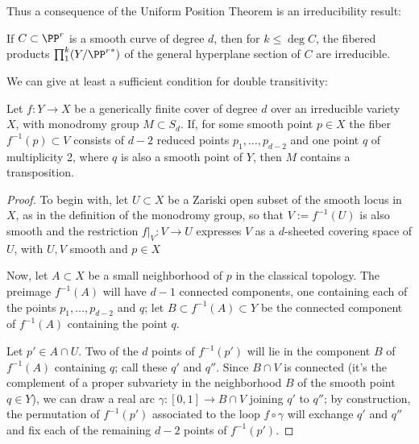 Thus a consequence of the Uniform Position Theorem is an irreducibility result:

\begin{corollary} If $C\subset \PP^r$ is a smooth curve of degree $d$, then 
for $k\leq \deg C$, the fibered products $\prod_1^k(Y/{\PP^r}^*)$  of the general hyperplane section 
of $C$ are irreducible.
\end{corollary}

We can give at least a sufficient condition for double transitivity:
\begin{lemma}\label{transposition lemma}
Let $f : Y \to X$ be a generically finite cover of degree $d$ over an irreducible variety $X$, with  monodromy group $M \subset S_d$.  
If,  for some smooth point $p \in X$ the fiber $f^{-1}(p)\subset V$ consists of $d-2$ reduced points $p_1,\dots, p_{d-2}$ and one point $q$ of multiplicity 2, where $q$ is also a smooth point of $Y$, then $M$ contains a transposition.
\end{lemma}

\begin{proof} To begin with, let $U \subset X$ be a Zariski open subset of the smooth locus in $X$, as in the definition of the monodromy group, so that  $V := f^{-1}(U)$ is also smooth and the restriction $f|_V : V \to U$ expresses $V$ as a $d$-sheeted covering space of $U$, with $U,V$ smooth and $p\in X$

Now, let $A \subset X$ be a small neighborhood of $p$ in the classical topology. The preimage $f^{-1}(A)$ will have $d-1$ connected components, one containing each of the points $p_1,\dots,p_{d-2}$ and $q$; let
 $B \subset f^{-1}(A) \subset Y$ be the connected component of $f^{-1}(A)$ containing the point $q$.

Let $p' \in A \cap U$. Two of the $d$ points of $f^{-1}(p')$ will lie in the component $B$ of $f^{-1}(A)$ containing $q$; call these $q'$ and $q''$. Since $B \cap V$ is connected (it's the complement of a proper subvariety in the neighborhood $B$ of the smooth point $q \in Y$), we can draw a real arc $\gamma : [0,1] \to B \cap V$ joining $q'$ to $q''$; by construction, the permutation of $f^{-1}(p')$ associated to the loop $f \circ \gamma$ will exchange $q'$ and $q''$ and fix each of the remaining $d-2$ points of $f^{-1}(p')$.
\end{proof}


